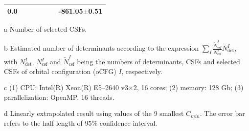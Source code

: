 \documentclass[journal=jcp,manuscript=suppinfo]{achemso}
\begin{document}
\begin{table}[!htp]
\begin{threeparttable}
\begin{tabular}{c|rrrrrrr}
			0.0\tnote{b}&&&&&&\multicolumn{2}{c}{-861.05$\pm$0.51}\\\bottomrule
		\end{tabular}
\begin{tablenotes}
\item[a]Number of selected CSFs.
\item[b]Estimated number of determinants according to the expression $\sum_I\frac{\tilde{N}_{\mathrm{csf}}^I}{N_{\mathrm{csf}}^I}N_{\mathrm{det}}^I$, with $N_{\mathrm{det}}^I$, $N_{\mathrm{csf}}^I$ and $\tilde{N}_{\mathrm{csf}}^I$ being the numbers of determinants, CSFs and selected CSFs of orbital configuration (oCFG) $I$, respectively.
\item[c](1) CPU: Intel(R) Xeon(R) E5--2640 v3$\times$2, 16 cores; (2) memory: 128 Gb;
			(3) parallelization: OpenMP, 16 threads.
\item[d]Linearly extrapolated result using values of the 9 smallest $C_{min}$. The error bar refers to the half length of 95\% confidence interval.
		\end{tablenotes}
	\end{threeparttable}
	\label{OldNO}
\end{table}
\end{document}
